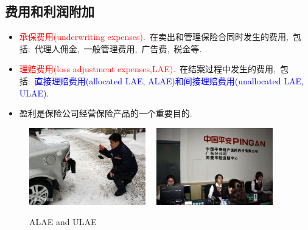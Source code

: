 \documentclass[professionalfont]{beamer}
\newcommand{\red}[1]{\textcolor{red}{#1}}
\newcommand{\blue}[1]{\textcolor{blue}{#1}}
\begin{document}
\subsection{费用和利润附加}
\begin{frame}
	\begin{itemize}
		\item \red{承保费用(underwriting expenses).}~在卖出和管理保险合同时发生的费用,~包括:~代理人佣金,~一般管理费用,~广告费,~税金等.
		\item \red{理赔费用(loss adjustment expenses,LAE).}~在结案过程中发生的费用,~包括:~\blue{直接理赔费用(allocated LAE, ALAE)和间接理赔费用(unallocated LAE, ULAE).}
		\item 盈利是保险公司经营保险产品的一个重要目的.
	\end{itemize}
\end{frame}
\begin{frame}
	\begin{figure}
		\includegraphics[width=0.45\textwidth]{Plots/ALAE.jpg}~~
		\includegraphics[width=0.45\textwidth]{Plots/ULAE.jpg}
		\caption{ALAE and ULAE}
	\end{figure}
\end{frame}
\end{document}
